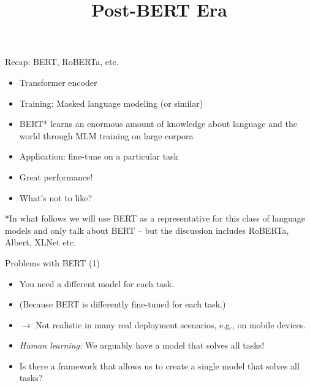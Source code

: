 


\usepackage{movie15}
\usepackage{animate}

\newcommand{\titlefigure}{figure/sesamestreet.jpeg}
\newcommand{\learninggoals}{
\item reformulating classification tasks
\item multi-task learning
\item fine-tuning on task-prefixes}

\title{Post-BERT Era}
\date{}




\begin{frame}{Recap: BERT, RoBERTa, etc.}

\vfill

  \begin{itemize}
\item Transformer encoder
\item Training: Masked language modeling (or similar)
\item BERT* learns an enormous amount of knowledge
about language and the world through MLM training on large corpora
\item Application: fine-tune on a particular task
\item Great performance!
\item \ques What's not to like?
    \end{itemize}

\vfill

*\scriptsize{In what follows we will use BERT as a representative for this class of language models and only talk about BERT -- but the discussion includes RoBERTa, Albert, XLNet etc.}

\end{frame}


\begin{frame}{Problems with BERT (1)}

\vfill

  \begin{itemize}
\item You need a different model for each task.
\item[] (Because BERT is differently fine-tuned for each task.)
\item[] $\to$ Not realistic in many real deployment scenarios, e.g., on mobile devices.
\item \textit{Human learning:} We arguably have a  model that solves all tasks!
\item \ques Is there a framework that allows us to create a single model that solves all tasks?
    \end{itemize}

\vfill

\end{frame}

